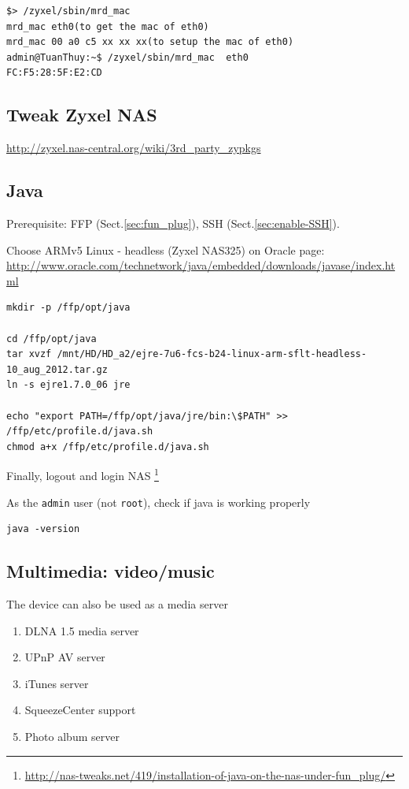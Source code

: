 \begin{verbatim}
$> /zyxel/sbin/mrd_mac
mrd_mac eth0(to get the mac of eth0)
mrd_mac 00 a0 c5 xx xx xx(to setup the mac of eth0)
admin@TuanThuy:~$ /zyxel/sbin/mrd_mac  eth0
FC:F5:28:5F:E2:CD
\end{verbatim}

\subsection{Tweak Zyxel NAS}

\url{http://zyxel.nas-central.org/wiki/3rd_party_zypkgs}

\subsection{Java}
\label{sec:Java}

Prerequisite: FFP (Sect.\ref{sec:fun_plug}), SSH (Sect.\ref{sec:enable-SSH}).

Choose ARMv5 Linux - headless (Zyxel NAS325) on Oracle page:
\url{http://www.oracle.com/technetwork/java/embedded/downloads/javase/index.html}

\begin{verbatim}
mkdir -p /ffp/opt/java

cd /ffp/opt/java
tar xvzf /mnt/HD/HD_a2/ejre-7u6-fcs-b24-linux-arm-sflt-headless-10_aug_2012.tar.gz
ln -s ejre1.7.0_06 jre

echo "export PATH=/ffp/opt/java/jre/bin:\$PATH" >> /ffp/etc/profile.d/java.sh
chmod a+x /ffp/etc/profile.d/java.sh
\end{verbatim}
Finally, logout and login NAS
\footnote{\url{http://nas-tweaks.net/419/installation-of-java-on-the-nas-under-fun_plug/}}

As the \verb!admin! user (not \verb!root!), check if java is working properly
\begin{verbatim}
java -version
\end{verbatim}


\subsection{Multimedia: video/music}

The device can also be used as a media server
\begin{enumerate}
  \item DLNA 1.5 media server
  \item UPnP AV server
 \item  iTunes server
 \item  SqueezeCenter support
 \item  Photo album server
\end{enumerate}

